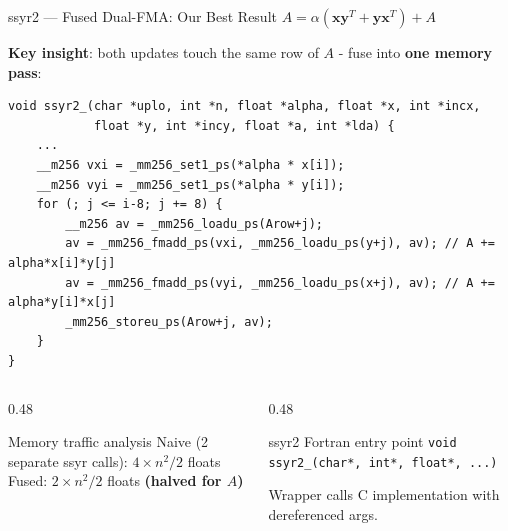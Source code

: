 \documentclass[aspectratio=169,10pt]{beamer}
\begin{document}
\begin{frame}[fragile]{ssyr2 --- Fused Dual-FMA: Our Best Result}
  $A = \alpha(\mathbf{x}\mathbf{y}^T + \mathbf{y}\mathbf{x}^T) + A$

  \textbf{Key insight}: both updates touch the same row of $A$ - fuse into \textbf{one memory pass}:
  \begin{lstlisting}
void ssyr2_(char *uplo, int *n, float *alpha, float *x, int *incx,
            float *y, int *incy, float *a, int *lda) {
    ...
    __m256 vxi = _mm256_set1_ps(*alpha * x[i]);
    __m256 vyi = _mm256_set1_ps(*alpha * y[i]);
    for (; j <= i-8; j += 8) {
        __m256 av = _mm256_loadu_ps(Arow+j);
        av = _mm256_fmadd_ps(vxi, _mm256_loadu_ps(y+j), av); // A += alpha*x[i]*y[j]
        av = _mm256_fmadd_ps(vyi, _mm256_loadu_ps(x+j), av); // A += alpha*y[i]*x[j]
        _mm256_storeu_ps(Arow+j, av);
    }
}
  \end{lstlisting}
  \begin{columns}
    \begin{column}{0.48\textwidth}
      \begin{exampleblock}{Memory traffic analysis}
        \footnotesize
        Naive (2 separate ssyr calls): $4 \times n^2/2$ floats\\
        Fused: $2 \times n^2/2$ floats \;\textbf{(halved for $A$)}
      \end{exampleblock}
    \end{column}
    \begin{column}{0.48\textwidth}
      \begin{block}{ssyr2 Fortran entry point}
        \texttt{void ssyr2\_(char*, int*, float*, ...)}
        
        Wrapper calls C implementation with dereferenced args.
      \end{block}
    \end{column}
  \end{columns}
\end{frame}
\end{document}
